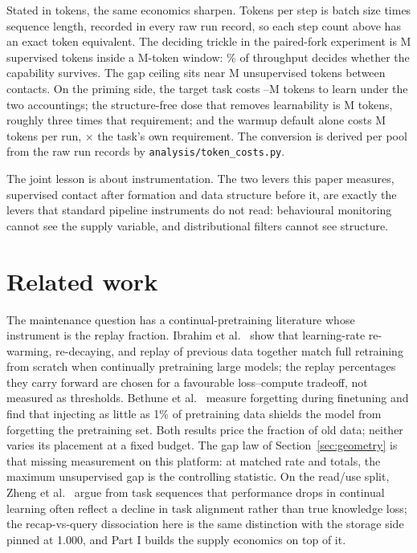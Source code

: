 \documentclass{article}
\begin{document}
Stated in tokens, the same economics sharpen. Tokens per step is batch size times sequence
length, recorded in every raw run record, so each step count above has an exact token
equivalent. The
deciding trickle in the paired-fork experiment is \TokTrickle{}M supervised tokens inside a
\TokWindow{}M-token window: \TokTricklePct\% of throughput decides whether the capability
survives. The gap ceiling sits near \TokGapFifty{}M unsupervised tokens between contacts. On
the priming side, the target task costs \TokBaseReqLo{}--\TokBaseReqHi{}M tokens to learn
under the two accountings; the structure-free dose that removes learnability is
\TokHarmDose{}M tokens, roughly three times that requirement; and the warmup default alone
costs \TokWuWaste{}M tokens per run, \TokWuWasteMult$\times$ the task's own requirement.
The conversion is derived per pool from the raw run records by
\texttt{analysis/token\_costs.py}.

The joint lesson is about instrumentation. The two levers this paper measures, supervised
contact after formation and data structure before it, are exactly the levers that standard
pipeline instruments do not read: behavioural monitoring cannot see the supply variable, and
distributional filters cannot see structure.

\section{Related work}
\label{sec:related}

The maintenance question has a continual-pretraining literature whose instrument is the
replay fraction. Ibrahim et al.\ \cite{ibrahim2024} show that learning-rate re-warming, re-decaying, and
replay of previous data together match full retraining from scratch when continually
pretraining large models; the replay percentages they carry forward are chosen for a
favourable loss--compute tradeoff, not measured as thresholds. Bethune et al.\ \cite{bethune2025} measure
forgetting during finetuning and find that injecting as little as 1\% of pretraining data
shields the model from forgetting the pretraining set. Both results price the fraction of
old data; neither varies its placement at a fixed budget. The gap law of
Section~\ref{sec:geometry} is that missing measurement on this platform: at matched rate
and totals, the maximum unsupervised gap is the controlling statistic. On the read/use
split, Zheng et al.\ \cite{zheng2025} argue from task sequences that performance drops in continual
learning often reflect a decline in task alignment rather than true knowledge loss; the
recap-vs-query dissociation here is the same distinction with the storage side pinned at
1.000, and Part I builds the supply economics on top of it.
\end{document}
